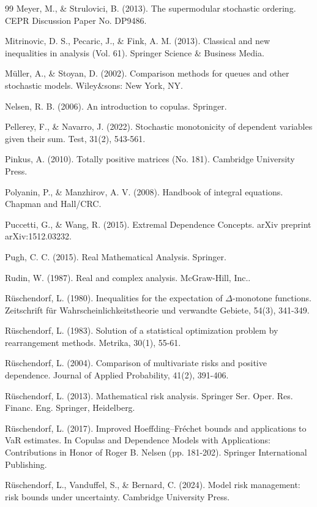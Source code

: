 \documentclass[onecolumn]{article}
\begin{document}
\begin{thebibliography}{99}
\bibitem{[26]} Meyer, M., \& Strulovici, B. (2013). The supermodular
stochastic ordering. CEPR Discussion Paper No. DP9486.

\bibitem{[67]} Mitrinovic, D. S., Pecaric, J., \& Fink, A. M. (2013).
Classical and new inequalities in analysis (Vol. 61). Springer Science \&
Business Media.

\bibitem{[28]} M\"{u}ller, A., \& Stoyan, D. (2002). Comparison methods for
queues and other stochastic models. Wiley\&sons: New York, NY.

\bibitem{[25]} Nelsen, R. B. (2006). An introduction to copulas. Springer.

\bibitem{[62]} Pellerey, F., \& Navarro, J. (2022). Stochastic monotonicity
of dependent variables given their sum. Test, 31(2), 543-561.

\bibitem{[65]} Pinkus, A. (2010). Totally positive matrices (No. 181).
Cambridge University Press.

\bibitem{[47]} Polyanin, P., \& Manzhirov, A. V. (2008). Handbook of
integral equations. Chapman and Hall/CRC.

\bibitem{[48]} Puccetti, G., \& Wang, R. (2015). Extremal Dependence
Concepts. arXiv preprint arXiv:1512.03232.

\bibitem{[46]} Pugh, C. C. (2015). Real Mathematical Analysis. Springer.

\bibitem{[45]} Rudin, W. (1987). Real and complex analysis. McGraw-Hill,
Inc..

\bibitem{[13]} R\"{u}schendorf, L. (1980). Inequalities for the expectation
of $\Delta $-monotone functions. Zeitschrift f\"{u}r
Wahrscheinlichkeitstheorie und verwandte Gebiete, 54(3), 341-349.

\bibitem{[34]} R\"{u}schendorf, L. (1983). Solution of a statistical
optimization problem by rearrangement methods. Metrika, 30(1), 55-61.

\bibitem{[31]} R\"{u}schendorf, L. (2004). Comparison of multivariate risks
and positive dependence. Journal of Applied Probability, 41(2), 391-406.

\bibitem{[5]} R\"{u}schendorf, L. (2013). Mathematical risk analysis.
Springer Ser. Oper. Res. Financ. Eng. Springer, Heidelberg.

\bibitem{[11]} R\"{u}schendorf, L. (2017). Improved Hoeffding--Fr\'{e}chet
bounds and applications to VaR estimates. In Copulas and Dependence Models
with Applications: Contributions in Honor of Roger B. Nelsen (pp. 181-202).
Springer International Publishing.

\bibitem{[17]} R\"{u}schendorf, L., Vanduffel, S., \& Bernard, C. (2024).
Model risk management: risk bounds under uncertainty. Cambridge University
Press.


\end{thebibliography}
\end{document}
